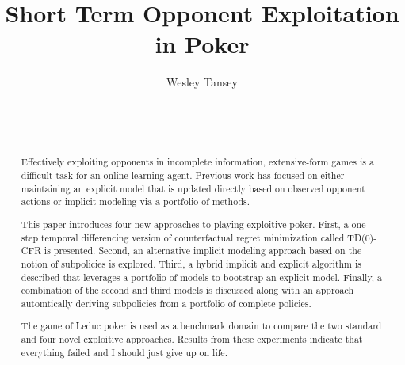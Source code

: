\documentclass{aamas2013}
\begin{document}


\title{Short Term Opponent Exploitation in Poker}


\author{
\alignauthor
Wesley Tansey\\
       \\
       \\
       \\
}

\maketitle

\begin{abstract}
Effectively exploiting opponents in incomplete information, extensive-form games is a difficult task for an online learning agent. Previous work has focused on either maintaining an explicit model that is updated directly based on observed opponent actions or implicit modeling via a portfolio of methods.

This paper introduces four new approaches to playing exploitive poker. First, a one-step temporal differencing version of counterfactual regret minimization called TD(0)-CFR is presented. Second, an alternative implicit modeling approach based on the notion of subpolicies is explored. Third, a hybrid implicit and explicit algorithm is described that leverages a portfolio of models to bootstrap an explicit model. Finally, a combination of the second and third models is discussed along with an approach automtically deriving subpolicies from a portfolio of complete policies.

The game of Leduc poker is used as a benchmark domain to compare the two standard and four novel exploitive approaches. Results from these experiments indicate that everything failed and I should just give up on life.
\end{abstract}


\end{document}

